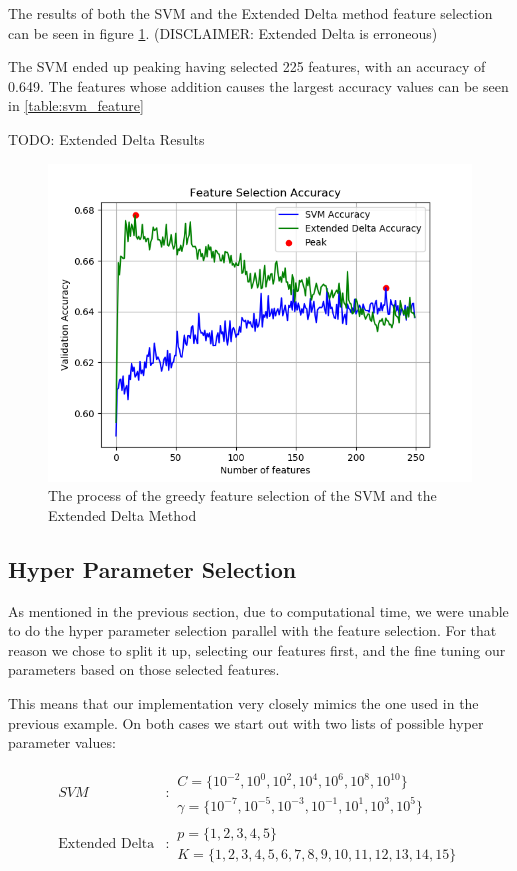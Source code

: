 The results of both the SVM and the Extended Delta method feature selection
can be seen in figure \ref{fig:fs_results}. (DISCLAIMER: Extended Delta is
erroneous)

The SVM ended up peaking having selected 225 features, with an accuracy of
0.649. The features whose addition causes the largest accuracy values can be
seen in \ref{table:svm_feature}

TODO: Extended Delta Results

\begin{figure}
\centering
\includegraphics[scale=0.8]{./pictures/experiments/baselines/FeatureSelect.png}
\caption{The process of the greedy feature selection of the SVM and the Extended Delta Method}
\label{fig:fs_results}
\end{figure}


\subsection{Hyper Parameter Selection}

As mentioned in the previous section, due to computational time, we were unable
to do the hyper parameter selection parallel with the feature selection. 
For that reason we chose to split it up, selecting our features first, and the 
fine tuning our parameters based on those selected features.

This means that our implementation very closely mimics the one used in the
previous example. On both cases we start out with two lists of possible hyper
parameter values:

\begin{align}
SVM&:
		\begin{array}{lr}
        C=\{10^{-2}, 10^0, 10^2, 10^4, 10^6, 10^8, 10^{10}\}\\
        \gamma=\{10^{-7}, 10^{-5}, 10^{-3}, 10^{-1}, 10^{1}, 10^3, 10^5\}
        \end{array}\\
\text{Extended Delta}&:
		\begin{array}{lr}
        p=\{1,2,3,4,5\}\\
        K=\{1,2,3,4,5,6,7,8,9,10,11,12,13,14,15\}
        \end{array}
\end{align}


